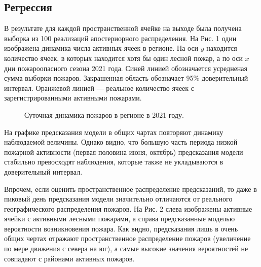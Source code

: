 \documentclass[a4paper,article,14pt]{extarticle}
\begin{document}
\subsection{Регрессия}

В результате для каждой пространственной ячейке на выходе была получена выборка из 100 реализаций апостериорного распределения. На Рис. 1 один изображена динамика числа активных ячеек в регионе. На оси $y$ находится количество ячеек, в которых находится хотя бы один лесной пожар, а по оси $x$ дни пожароопасного сезона 2021 года. Синей линией обозначается усредненая сумма выборки пожаров. Закрашенная область обозначает 95\% доверительный интервал. Оранжевой линией — реальное количество ячеек с зарегистрированными активными пожарами.

\begin{figure}[ht]
\begin{center}
\caption{
\label{cinema}
	Суточная динамика пожаров в регионе в 2021 году.}
\end {center}
\end {figure}

На графике предсказания модели в общих чартах повторяют динамику наблюдаемой величины. Однако видно, что большую часть периода низкой пожарной активности (первая половина июня, октябрь) предсказания модели стабильно превосходят наблюдения, которые также не укладываются в доверительный интервал.

Впрочем, если оценить пространственное распределение предсказаний, то даже в пиковый день предсказания модели значительно отличаются от реального географического распределения пожаров. На Рис. 2 слева изображены активные ячейки с активными лесными пожарами, а справа предсказанные моделью вероятности возникновения пожара. Как видно, предсказания лишь в очень общих чертах отражают пространственное распределение пожаров (увеличение по мере движения с севера на юг), а самые высокие значения вероятностей не совпадают с районами активных пожаров.
\end{document}
